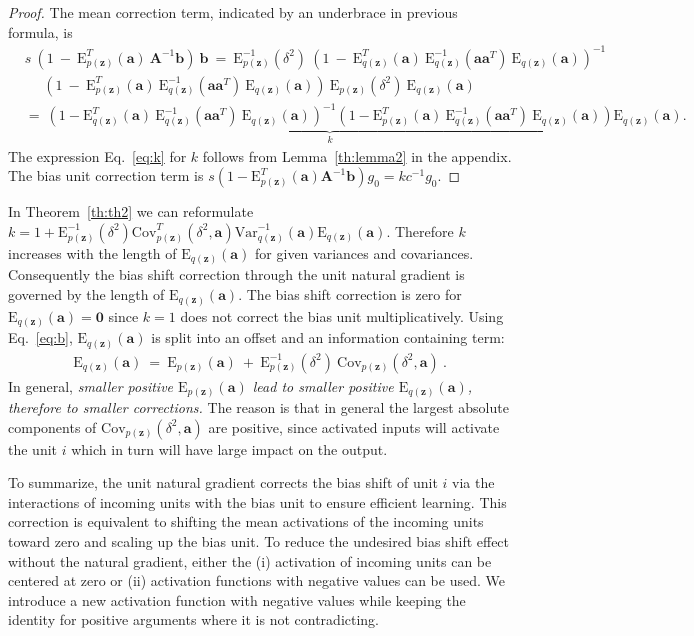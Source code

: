 \documentclass{article}
\newcommand\Ba{\bm{a}}
\newcommand\Bb{\bm{b}}
\newcommand\Bz{\bm{z}}
\newcommand\BA{\bm{A}}
\newcommand\BZe{\bm{0}}
\newcommand\EXP{\mathbf{\mathrm{E}}}
\newcommand\VAR{\mathbf{\mathrm{Var}}}
\newcommand\COV{\mathbf{\mathrm{Cov}}}
\begin{document}
\begin{proof}
The mean correction term, indicated by an underbrace in previous
formula, is
\begin{align}
&s \ \left( 1 \ - \ \EXP_{p(\Bz)}^T (\Ba) \ \BA^{-1} \Bb \right) \ \Bb \
=  \ \EXP_{p(\Bz)}^{-1} ( \delta^2 ) \ \left( 1 \ - \ \EXP_{q(\Bz)}^T
(\Ba)  \ \EXP_{q(\Bz)}^{-1} (\Ba \Ba^T) \ \EXP_{q(\Bz)}
(\Ba) \right)^{-1}\\\nonumber
&~~~~~~\left( 1 \ - \ \EXP_{p(\Bz)}^T (\Ba) \
\EXP_{q(\Bz)}^{-1} (\Ba \Ba^T)  \ \EXP_{q(\Bz)} (\Ba) \right) \
\EXP_{p(\Bz)} ( \delta^2 ) \ \EXP_{q(\Bz)} (\Ba) \\\nonumber
&= \ \underbrace{\left( 1  -  \EXP_{q(\Bz)}^T(\Ba)  \
\EXP_{q(\Bz)}^{-1} (\Ba \Ba^T) \ \EXP_{q(\Bz)}(\Ba) \right)^{-1}
\left( 1  -  \EXP_{p(\Bz)}^T (\Ba) \ \EXP_{q(\Bz)}^{-1} (\Ba \Ba^T)
\ \EXP_{q(\Bz)}(\Ba) \right)}_{k}  \EXP_{q(\Bz)}(\Ba) .
\end{align}
The expression Eq.~\eqref{eq:k} for $k$ follows from
Lemma~\ref{th:lemma2} in the appendix.
The bias unit correction term is
$s \left( 1 - \EXP_{p(\Bz)}^T (\Ba) \BA^{-1} \Bb \right) g_0 =
k c^{-1} g_0$.
\end{proof}


In Theorem~\ref{th:th2} we can reformulate
$k =  1  +   \EXP_{p(\Bz)}^{-1} ( \delta^2 ) \COV_{p(\Bz)}^T (  \delta^2 , \Ba )
\VAR_{q(\Bz)}^{-1}(\Ba) \EXP_{q(\Bz)}(\Ba)$. Therefore $k$ increases with the length of
$\EXP_{q(\Bz)}(\Ba)$ for given variances and covariances.
Consequently the bias shift correction through the
unit natural gradient is governed by the length of $\EXP_{q(\Bz)}(\Ba)$.
The bias shift correction is zero for $\EXP_{q(\Bz)} (\Ba)=\BZe$ since
$k=1$ does not correct the bias unit multiplicatively.
Using Eq.~\eqref{eq:b}, $\EXP_{q(\Bz)}(\Ba)$ is split into an
offset and an information containing term:
\begin{align}
\EXP_{q(\Bz)} (\Ba) \ =  \ \EXP_{p(\Bz)} (\Ba) \ + \
\EXP_{p(\Bz)}^{-1} ( \delta^2 ) \
\COV_{p(\Bz)} ( \delta^2 , \Ba ) \ .
\end{align}
In general, {\em smaller positive $\EXP_{p(\Bz)} (\Ba)$ lead to smaller
positive $\EXP_{q(\Bz)}(\Ba)$, therefore to smaller corrections.}
The reason is that in general the largest absolute components
of $\COV_{p(\Bz)} (\delta^2, \Ba )$ are positive,
since activated inputs will activate the unit $i$ which in turn will have
large impact on the output.


To summarize,
the unit natural gradient corrects the bias shift of unit $i$
via the interactions of incoming units with the bias unit
to ensure efficient learning.
This correction is equivalent to shifting the mean activations
of the incoming units toward zero and scaling up the bias unit.
To reduce the undesired bias shift effect without the natural gradient,
either the
(i) activation of incoming units can be
centered at zero
or (ii) activation functions with negative values can be used.
We introduce a new activation function with negative values while
keeping the identity for positive arguments where it is not contradicting.
\end{document}
